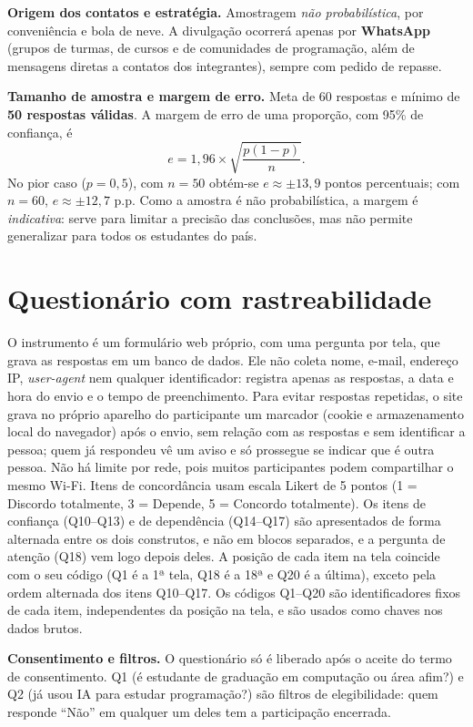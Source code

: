 \documentclass[11pt,a4paper]{article}
\begin{document}
\textbf{Origem dos contatos e estratégia.} Amostragem \emph{não probabilística}, por conveniência e bola de neve. A divulgação ocorrerá apenas por \textbf{WhatsApp} (grupos de turmas, de cursos e de comunidades de programação, além de mensagens diretas a contatos dos integrantes), sempre com pedido de repasse.

\textbf{Tamanho de amostra e margem de erro.} Meta de 60 respostas e mínimo de \textbf{50 respostas válidas}. A margem de erro de uma proporção, com 95\% de confiança, é
\[
e = 1{,}96 \times \sqrt{\frac{p(1-p)}{n}}.
\]
No pior caso ($p = 0{,}5$), com $n = 50$ obtém-se $e \approx \pm 13{,}9$ pontos percentuais; com $n = 60$, $e \approx \pm 12{,}7$ p.p. Como a amostra é não probabilística, a margem é \emph{indicativa}: serve para limitar a precisão das conclusões, mas não permite generalizar para todos os estudantes do país.

\section{Questionário com rastreabilidade}

O instrumento é um formulário web próprio, com uma pergunta por tela, que grava as respostas em um banco de dados. Ele não coleta nome, e-mail, endereço IP, \emph{user-agent} nem qualquer identificador: registra apenas as respostas, a data e hora do envio e o tempo de preenchimento. Para evitar respostas repetidas, o site grava no próprio aparelho do participante um marcador (cookie e armazenamento local do navegador) após o envio, sem relação com as respostas e sem identificar a pessoa; quem já respondeu vê um aviso e só prossegue se indicar que é outra pessoa. Não há limite por rede, pois muitos participantes podem compartilhar o mesmo Wi-Fi. Itens de concordância usam escala Likert de 5 pontos (1 = Discordo totalmente, 3 = Depende, 5 = Concordo totalmente). Os itens de confiança (Q10--Q13) e de dependência (Q14--Q17) são apresentados de forma alternada entre os dois construtos, e não em blocos separados, e a pergunta de atenção (Q18) vem logo depois deles. A posição de cada item na tela coincide com o seu código (Q1 é a 1ª tela, Q18 é a 18ª e Q20 é a última), exceto pela ordem alternada dos itens Q10--Q17. Os códigos Q1--Q20 são identificadores fixos de cada item, independentes da posição na tela, e são usados como chaves nos dados brutos.

\textbf{Consentimento e filtros.} O questionário só é liberado após o aceite do termo de consentimento. Q1 (é estudante de graduação em computação ou área afim?) e Q2 (já usou IA para estudar programação?) são filtros de elegibilidade: quem responde ``Não'' em qualquer um deles tem a participação encerrada.
\end{document}
